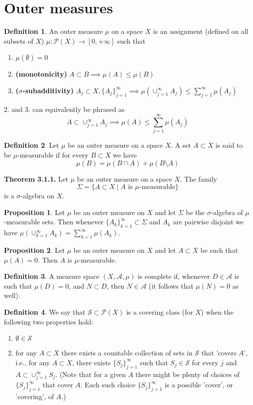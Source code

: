 \documentclass[a4paper,14pt]{extarticle}
\theoremstyle{definition}
\newtheorem{definition}{Definition}
\newtheorem{proposition}{Proposition}
\begin{document}
\section{Outer measures}
\begin{definition}
  An outer measure $\mu$ on a space $X$ is an assignment (defined on all subsets of $X$)
  $\mu:\mathcal{P}(X)\rightarrow[0,+\infty]$ such 
  that 
  \begin{enumerate}
    \item $\mu(\emptyset)=0$
    \item \textbf{(monotonicity)} $A\subset B\implies \mu(A)\leq\mu(B)$
    \item \textbf{($\sigma$-subadditivity)} $A_j\subset X, \{A_j\}_{j=1}^\infty\implies\mu(\cup_{j=1}^\infty A_j)\leq\sum_{j=1}^\infty\mu(A_j)$
  \end{enumerate}
\end{definition}
2. and 3. can equivalently be phrased as 
\[A\subset\cup_{j=1}^\infty A_j\implies\mu(A)\leq
\sum_{j=1}^\infty\mu(A_j)\]
\begin{definition}
  Let $\mu$ be an outer measure on a space $X$. A 
  set $A\subset X$ is said to be $\mu$-measurable if for every $B\subset X$ we have 
  \[\mu(B)=\mu(B\cap A)+\mu(B\setminus A)\]
\end{definition}
\noindent\textbf{Theorem 3.1.1.} Let $\mu$ be an outer measure on a space $X$. The family 
\[\Sigma=\{A\subset X\mid A\text{ is $\mu$-measurable}\}\]
is a $\sigma$-algebra on $X$.
\begin{proposition}
  Let $\mu$ be an outer measure on $X$ and let $\Sigma$ be the $\sigma$-algebra of $\mu$-measurable sets. Then whenever $\{A_k\}_{k=1}^\infty\subset\Sigma$ and $A_k$ are pairwise 
  disjoint we have $\mu(\cup_{k=1}^\infty A_k)=
  \sum_{k=1}^\infty \mu(A_k)$.
\end{proposition}
\begin{proposition}
  Let $\mu$ be an outer measure on $X$ and let 
  $A\subset X$ be such that $\mu(A)=0$. Then $A$ is 
  $\mu$-measurable.
\end{proposition}
\begin{definition}
  A measure space $(X,\mathcal{A},\mu)$ is complete if, whenever $D\in\mathcal{A}$ is such that $\mu(D)=0$, and $N\subset D$, then $N\in\mathcal{A}$ (it follows that $\mu(N)=0$ as well).
\end{definition}
\begin{definition}
  We say that $\mathcal{S}\subset\mathcal{P}(X)$
  is a 
  covering class (for $X$) when the following two 
  properties hold:
  \begin{enumerate}
    \item $\emptyset\in\mathcal{S}$
    \item for any $A\subset X$ there exists a countable collection of sets in $\mathcal{S}$
    that 'covers $A$', i.e., for any $A\subset X$,
    there exists $\{S_j\}_{j=1}^\infty$ such that 
    $S_j\in\mathcal{S}$ for every $j$ and 
    $A\subset\cup_{j=1}^\infty S_j$. (Note that 
    for a given $A$ there might be plenty of choices of $\{S_j\}_{j=1}^\infty$ that cover $A$. Each such choice $\{S_j\}_{j=1}^\infty$ is a possible 'cover', or 'covering', of $A$.)
  \end{enumerate}
\end{definition}
\end{document}
